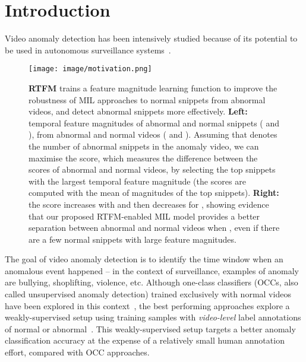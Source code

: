 \documentclass[final]{cvpr}
\begin{document}
\section{Introduction}
Video anomaly detection has been intensively studied because of its potential to be used in autonomous surveillance systems~\cite{sultani2018real,hasan2016learning,Wu2020not,zhong2019graph}.
\begin{figure}[t]
\begin{center}
\small
  \texttt{[image: image/motivation.png]}
\end{center}
  \caption{\textbf{RTFM} trains a feature magnitude learning function to improve the robustness of MIL approaches to normal snippets from abnormal videos, and detect  abnormal snippets more effectively. \textbf{Left:} temporal feature magnitudes of abnormal and normal snippets ( and ), from abnormal and normal videos (\textcolor{red}{} and \textcolor{blue}{}). Assuming that  denotes the number of abnormal snippets in the anomaly video,  
  we can maximise the score, which measures the difference between the scores of abnormal and normal videos, by selecting the top  snippets with the largest temporal feature magnitude (the scores are computed with the mean of magnitudes of the top  snippets). \textbf{Right:}  the score increases with  and then decreases for , showing evidence that our proposed RTFM-enabled MIL model provides a better separation between abnormal and normal videos when , even if there are a few normal snippets with large feature magnitudes.}
\label{fig:intro}
\vspace{-.1in}
\end{figure}
The goal of video anomaly detection is to identify the time window when an anomalous event happened -- in the context of surveillance, examples of anomaly are bullying, shoplifting, violence, etc. 
Although one-class classifiers (OCCs, also called unsupervised anomaly detection) trained exclusively with normal videos have been explored in this context~\cite{hasan2016learning,zhang2016video,ravanbakhsh2017abnormal,ravanbakhsh2018plug,luo2017revisit,liu2018future, hinami2017joint}, the best performing approaches explore  
a weakly-supervised setup using training samples with \textit{video-level} label annotations of normal or abnormal~\cite{Wu2020not,zhong2019graph,sultani2018real}. This weakly-supervised setup
targets a better anomaly classification accuracy at the expense of a relatively small human annotation effort, compared with OCC approaches.
\end{document}
